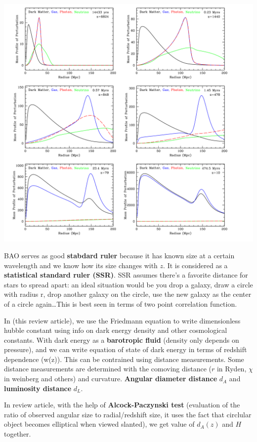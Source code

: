 \documentclass[11pt]{article}
\begin{document}
\begin{center}
    \includegraphics[scale=0.5]{BAO Evolution.png}
\end{center}

BAO serves as good \textbf{stabdard ruler} because it has known size at a certain wavelength and we know how its size changes with $z$. 
It is considered as a \textbf{statistical standard ruler (SSR)}. SSR assumes there's a favorite distance for stars to spread apart: an ideal situation would be you drop a galaxy, draw a circle with radius r, drop another galaxy on the circle, use the new galaxy as the center of a circle again\dots This is best seen in terms of two point correlation function.

In (this review article), we use the Friedmann equation to write dimensionless hubble constant using info on dark energy density and other cosmological constants.
With dark energy as a \textbf{barotropic fluid} (density only depends on pressure), and we can write equation of state of dark energy in terms of redshift dependence (w(z)). This can be contrained using distance measurements. 
Some distance measurements are determined with the comoving distance ($r$ in Ryden, $\chi$ in weinberg and others) and curvature. \textbf{Angular diameter distance} $d_A$ and \textbf{luminosity distance} $d_L$.

In review article, with the help of \textbf{Alcock-Paczynski test} (evaluation of the ratio of observed angular size to radial/redshift size, it uses the fact that circlular object becomes elliptical when viewed slanted), we get value of $d_A(z)$ and $H$
together. 
\end{document}
